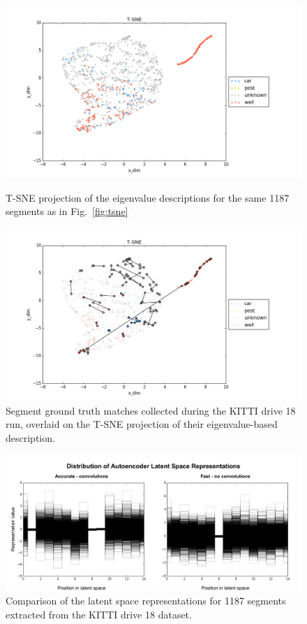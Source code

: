 \begin{figure}[p]
  \centering
  \includegraphics[width=5.2in]{images/t-sne_eig.png}
\caption{T-SNE projection of the eigenvalue descriptions for the same 1187 segments as in Fig.~\ref{fig:tsne}}
  \label{fig:tsne_eig}
  \hfill
  \includegraphics[width=5.2in]{images/t-sne_matches_eig.png}
\caption{Segment ground truth matches collected during the KITTI drive 18 run, overlaid on the T-SNE projection of their eigenvalue-based description.}
  \label{fig:tsne_matches_eig}
\end{figure}

\begin{figure}
  \centering
  \includegraphics[width=5.2in]{images/fastvaccuratefeatures.pdf}
  \caption{Comparison of the latent space representations for 1187 segments extracted from the KITTI drive 18 dataset.}
  \label{fig:fastvaccurate_features}
\end{figure}

